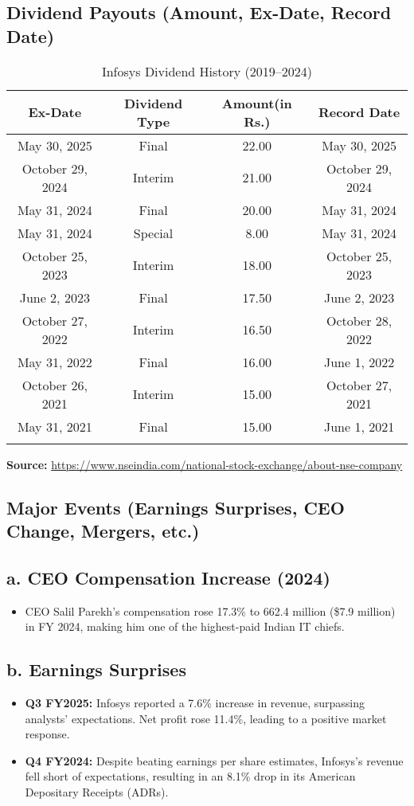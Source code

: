 \documentclass{article}
\begin{document}
\subsection{Dividend Payouts (Amount, Ex-Date, Record Date)}
\begin{longtable}{|c|c|c|c|}

\hline
\textbf{Ex-Date} & \textbf{Dividend Type} & \textbf{Amount(in Rs.)} & \textbf{Record Date} \\
\hline
\endhead
May 30, 2025 & Final & 22.00 & May 30, 2025 \\
October 29, 2024 & Interim & 21.00 & October 29, 2024 \\
May 31, 2024 & Final & 20.00 & May 31, 2024 \\
May 31, 2024 & Special & 8.00 & May 31, 2024 \\
October 25, 2023 & Interim & 18.00 & October 25, 2023 \\
June 2, 2023 & Final & 17.50 & June 2, 2023 \\
October 27, 2022 & Interim & 16.50 & October 28, 2022 \\
May 31, 2022 & Final & 16.00 & June 1, 2022 \\
October 26, 2021 & Interim & 15.00 & October 27, 2021 \\
May 31, 2021 & Final & 15.00 & June 1, 2021 \\
\hline
\caption{Infosys Dividend History (2019–2024)}
\label{tab:dividends}
\end{longtable}
\noindent\textbf{Source:} \href{https://www.nseindia.com/national-stock-exchange/about-nse-company}{https://www.nseindia.com/national-stock-exchange/about-nse-company}

\subsection{Major Events (Earnings Surprises, CEO Change, Mergers, etc.)}
\subsection*{a. CEO Compensation Increase (2024)}
\begin{itemize}
    \item CEO Salil Parekh's compensation rose 17.3\% to 662.4 million (\$7.9 million) in FY 2024, making him one of the highest-paid Indian IT chiefs.
\end{itemize}

\subsection*{b. Earnings Surprises}
\begin{itemize}
    \item \textbf{Q3 FY2025:} Infosys reported a 7.6\% increase in revenue, surpassing analysts' expectations. Net profit rose 11.4\%, leading to a positive market response.
    \item \textbf{Q4 FY2024:} Despite beating earnings per share estimates, Infosys's revenue fell short of expectations, resulting in an 8.1\% drop in its American Depositary Receipts (ADRs).
\end{itemize}
\end{document}
